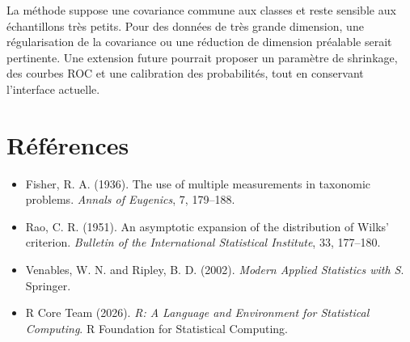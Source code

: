 \documentclass[11pt,a4paper]{article}
\begin{document}
La méthode suppose une covariance commune aux classes et reste sensible aux
échantillons très petits. Pour des données de très grande dimension, une
régularisation de la covariance ou une réduction de dimension préalable
serait pertinente. Une extension future pourrait proposer un paramètre de
shrinkage, des courbes ROC et une calibration des probabilités, tout en
conservant l'interface actuelle.

\section{Références}

\begin{itemize}
\item Fisher, R. A. (1936). The use of multiple measurements in taxonomic
      problems. \emph{Annals of Eugenics}, 7, 179--188.
\item Rao, C. R. (1951). An asymptotic expansion of the distribution of
      Wilks' criterion. \emph{Bulletin of the International Statistical
      Institute}, 33, 177--180.
\item Venables, W. N. and Ripley, B. D. (2002).
      \emph{Modern Applied Statistics with S}. Springer.
\item R Core Team (2026). \emph{R: A Language and Environment for Statistical
      Computing}. R Foundation for Statistical Computing.
\end{itemize}
\end{document}
